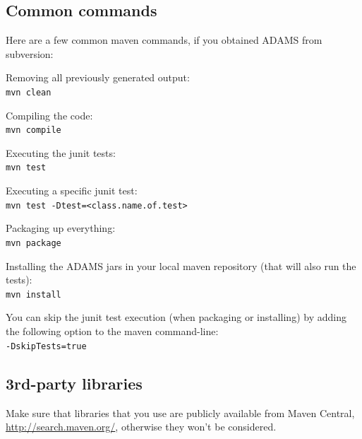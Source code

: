 \subsection{Common commands}
Here are a few common maven commands, if you obtained ADAMS from subversion:
\begin{tight_itemize}
	\item Removing all previously generated output: \\
    \texttt{mvn clean}
	\item Compiling the code: \\
    \texttt{mvn compile}
	\item Executing the junit tests: \\
    \texttt{mvn test}
	\item Executing a specific junit test: \\
    \texttt{mvn test -Dtest=<class.name.of.test>}
	\item Packaging up everything: \\
    \texttt{mvn package}
	\item Installing the ADAMS jars in your local maven repository (that will also
	run the tests): \\
    \texttt{mvn install}
	\item You can skip the junit test execution (when packaging or installing) by
	adding the following option to the maven command-line: \\
    \texttt{-DskipTests=true}
\end{tight_itemize}

\subsection{3rd-party libraries}
Make sure that libraries that you use are publicly available from Maven 
Central, \url{http://search.maven.org/}{}, otherwise they won't be considered.

